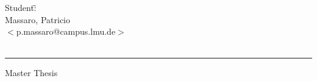 \documentclass[11pt]{article}
\numberwithin{equation}{section}
\numberwithin{figure}{section}
\numberwithin{table}{section}
\begin{document}
\begin{titlepage}
\vspace{2cm}

\begin{tabbing}
	Student:\hspace{-1cm}\=\+\hspace{1cm}\=\hspace{6cm}\=\\
		Massaro, Patricio	\>\> \\
			\>\footnotesize{$<$p.massaro@campus.lmu.de$>$}\\
		\\
\end{tabbing}

\vfill

\hrule
\vspace{0.2cm}
\noindent\small{Master Thesis\hfill }
\end{titlepage}



\tableofcontents
\newpage

%
%
\setcounter{page}{1}











\newpage

\pagestyle{empty}


\end{document}
